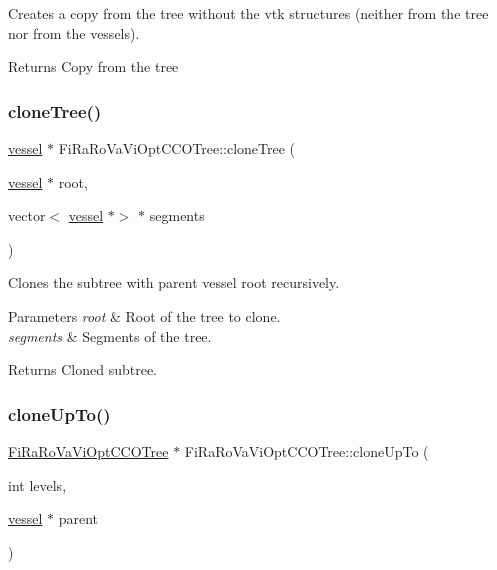 Creates a copy from the tree without the vtk structures (neither from the tree nor from the vessels). \begin{DoxyReturn}{Returns}
Copy from the tree 
\end{DoxyReturn}
\mbox{\label{class_fi_ra_ro_va_vi_opt_c_c_o_tree_a8a74a523182acf01b31f2a45d29263b2}} 
\subsubsection{\texorpdfstring{clone\+Tree()}{cloneTree()}}
{\footnotesize\ttfamily \mbox{\hyperlink{structvessel}{vessel}} $\ast$ Fi\+Ra\+Ro\+Va\+Vi\+Opt\+C\+C\+O\+Tree\+::clone\+Tree (\begin{DoxyParamCaption}\item[{\mbox{\hyperlink{structvessel}{vessel}} $\ast$}]{root,  }\item[{vector$<$ \mbox{\hyperlink{structvessel}{vessel}} $\ast$$>$ $\ast$}]{segments }\end{DoxyParamCaption})\hspace{0.3cm}{\ttfamily [private]}}

Clones the subtree with parent vessel {\ttfamily root} recursively. 
\begin{DoxyParams}{Parameters}
{\em root} & Root of the tree to clone. \\
\hline
{\em segments} & Segments of the tree. \\
\hline
\end{DoxyParams}
\begin{DoxyReturn}{Returns}
Cloned subtree. 
\end{DoxyReturn}
\mbox{\label{class_fi_ra_ro_va_vi_opt_c_c_o_tree_a86cd7106b4911517c645496456ba302f}} 
\subsubsection{\texorpdfstring{clone\+Up\+To()}{cloneUpTo()}}
{\footnotesize\ttfamily \mbox{\hyperlink{class_fi_ra_ro_va_vi_opt_c_c_o_tree}{Fi\+Ra\+Ro\+Va\+Vi\+Opt\+C\+C\+O\+Tree}} $\ast$ Fi\+Ra\+Ro\+Va\+Vi\+Opt\+C\+C\+O\+Tree\+::clone\+Up\+To (\begin{DoxyParamCaption}\item[{int}]{levels,  }\item[{\mbox{\hyperlink{structvessel}{vessel}} $\ast$}]{parent }\end{DoxyParamCaption})\hspace{0.3cm}{\ttfamily [private]}}

